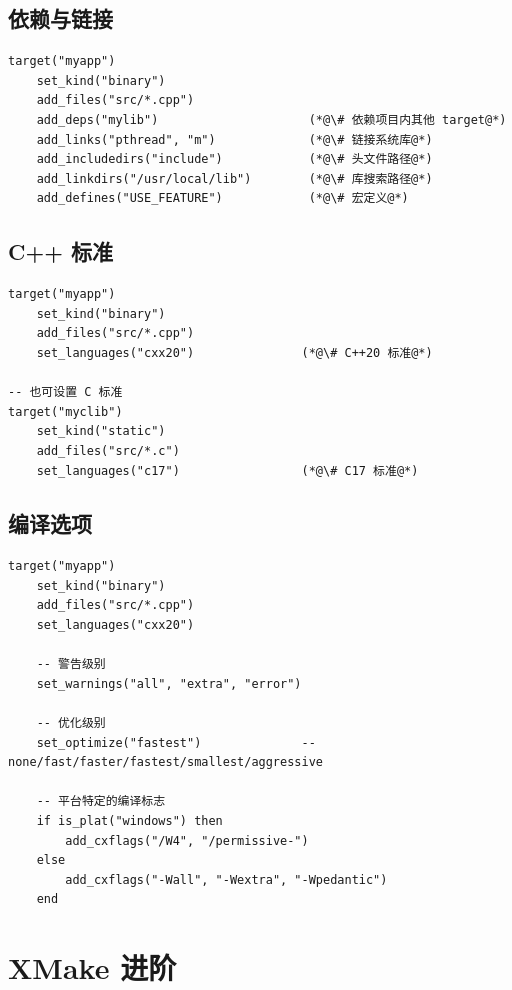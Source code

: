\documentclass[12pt,a4paper,fontset=fandol]{ctexbook}
\begin{document}
\section{依赖与链接}

\begin{lstlisting}[style=xmakestyle]
target("myapp")
    set_kind("binary")
    add_files("src/*.cpp")
    add_deps("mylib")                     (*@\# 依赖项目内其他 target@*)
    add_links("pthread", "m")             (*@\# 链接系统库@*)
    add_includedirs("include")            (*@\# 头文件路径@*)
    add_linkdirs("/usr/local/lib")        (*@\# 库搜索路径@*)
    add_defines("USE_FEATURE")            (*@\# 宏定义@*)
\end{lstlisting}

\section{C++ 标准}

\begin{lstlisting}[style=xmakestyle]
target("myapp")
    set_kind("binary")
    add_files("src/*.cpp")
    set_languages("cxx20")               (*@\# C++20 标准@*)

-- 也可设置 C 标准
target("myclib")
    set_kind("static")
    add_files("src/*.c")
    set_languages("c17")                 (*@\# C17 标准@*)
\end{lstlisting}

\section{编译选项}

\begin{lstlisting}[style=xmakestyle]
target("myapp")
    set_kind("binary")
    add_files("src/*.cpp")
    set_languages("cxx20")

    -- 警告级别
    set_warnings("all", "extra", "error")

    -- 优化级别
    set_optimize("fastest")              -- none/fast/faster/fastest/smallest/aggressive

    -- 平台特定的编译标志
    if is_plat("windows") then
        add_cxflags("/W4", "/permissive-")
    else
        add_cxflags("-Wall", "-Wextra", "-Wpedantic")
    end
\end{lstlisting}

\chapter{XMake 进阶}
\end{document}
